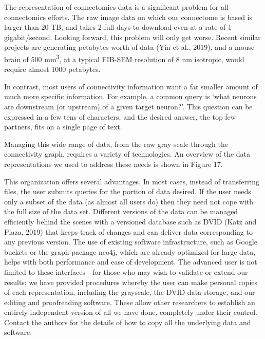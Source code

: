 \documentclass{article}
\begin{document}
The representation of connectomics data is a significant problem for all connectomics efforts. The raw image data on which our connectome is based is larger than 20 TB, and takes 2 full days to download even at a rate of 1 gigabit/second. Looking forward, this problem will only get worse. Recent similar projects are generating petabytes worth of data (Yin et al., 2019), and a mouse brain of 500 mm\textsuperscript{3}, at a typical FIB-SEM resolution of 8 nm isotropic, would require almost 1000 petabytes.

In contrast, most users of connectivity information want a far smaller amount of much more specific information. For example, a common query is ‘what neurons are downstream (or upstream) of a given target neuron?’. This question can be expressed in a few tens of characters, and the desired answer, the top few partners, fits on a single page of text.

Managing this wide range of data, from the raw gray-scale through the connectivity graph, requires a variety of technologies. An overview of the data representations we used to address these needs is shown in Figure 17.

This organization offers several advantages. In most cases, instead of transferring files, the user submits queries for the portion of data desired. If the user needs only a subset of the data (as almost all users do) then they need not cope with the full size of the data set. Different versions of the data can be managed efficiently behind the scenes with a versioned database such as DVID (Katz and Plaza, 2019) that keeps track of changes and can deliver data corresponding to any previous version. The use of existing software infrastructure, such as Google buckets or the graph package neo4j, which are already optimized for large data, helps with both performance and ease of development. The advanced user is not limited to these interfaces - for those who may wish to validate or extend our results; we have provided procedures whereby the user can make personal copies of each representation, including the grayscale, the DVID data storage, and our editing and proofreading software. These allow other researchers to establish an entirely independent version of all we have done, completely under their control. Contact the authors for the details of how to copy all the underlying data and software.
\end{document}
